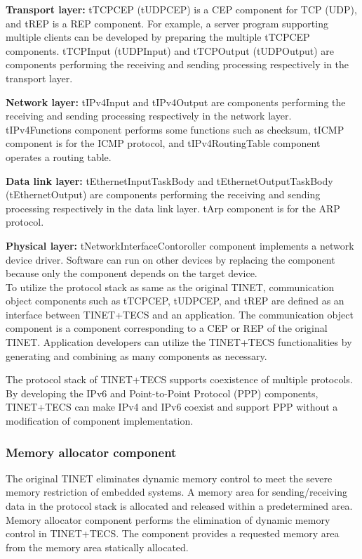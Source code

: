 \documentclass[conference]{IEEEtran/IEEEtran}
\begin{document}
{\bf Transport layer:}
tTCPCEP (tUDPCEP) is a CEP component for TCP (UDP), and tREP is a REP component.
For example, a server program supporting multiple clients can be developed by preparing the multiple tTCPCEP components.
tTCPInput (tUDPInput) and tTCPOutput (tUDPOutput) are components performing the receiving and sending processing respectively in the transport layer.

{\bf Network layer:}
tIPv4Input and tIPv4Output are components performing the receiving and sending processing respectively in the network layer.
tIPv4Functions component performs some functions such as checksum, tICMP component is for the ICMP protocol, and tIPv4RoutingTable component operates a routing table.

{\bf Data link layer:}
tEthernetInputTaskBody and tEthernetOutputTaskBody (tEthernetOutput) are components performing the receiving and sending processing respectively in the data link layer.
tArp component is for the ARP protocol.

{\bf Physical layer:}
tNetworkInterfaceContoroller component implements a network device driver.
Software can run on other devices by replacing the component because only the component depends on the target device.\\

To utilize the protocol stack as same as the original TINET, communication object components such as tTCPCEP, tUDPCEP, and tREP are defined as an interface between TINET+TECS and an application.
The communication object component is a component corresponding to a CEP or REP of the original TINET.
Application developers can utilize the TINET+TECS functionalities by generating and combining as many components as necessary.

The protocol stack of TINET+TECS supports coexistence of multiple protocols.
By developing the IPv6 and Point-to-Point Protocol (PPP) components, TINET+TECS can make IPv4 and IPv6 coexist and support PPP without a modification of component implementation.

\subsubsection{Memory allocator component} 

The original TINET eliminates dynamic memory control to meet the severe memory restriction of embedded systems.
A memory area for sending/receiving data in the protocol stack is allocated and released within a predetermined area.
Memory allocator component performs the elimination of dynamic memory control in TINET+TECS.
The component provides a requested memory area from the memory area statically allocated.
\end{document}
